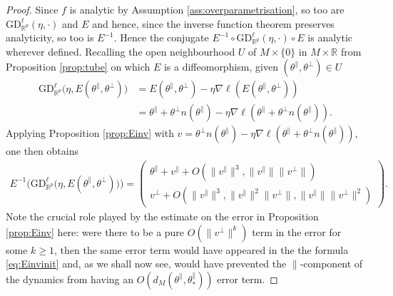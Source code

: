 \documentclass{article}
\newcommand{\RB}{\mathbb{R}}
\newcommand{\tpa}{\theta^{\parallel}}
\newcommand{\tpe}{\theta^{\perp}}
\newcommand{\GD}{\mathrm{GD}}
\theoremstyle{plain}
\theoremstyle{definition}
\theoremstyle{remark}
\begin{document}
\begin{proof}
    Since $f$ is analytic by Assumption \ref{ass:overparametrisation}, so too are $\GD^{\ell}_{\RB^p}(\eta,\cdot)$ and $E$ and hence, since the inverse function theorem preserves analyticity, so too is $E^{-1}$. Hence the conjugate $E^{-1}\circ\GD^{\ell}_{\RB^p}(\eta,\cdot)\circ E$ is analytic wherever defined. Recalling the open neighbourhood $U$ of $M\times\{0\}$ in $M\times\RB$ from Proposition \ref{prop:tube} on which $E$ is a diffeomorphism, given $(\tpa,\tpe)\in U$
    \begin{align}
        \GD_{\RB^p}^{\ell}\big(\eta,E(\tpa,\tpe)\big) &= E(\tpa,\tpe)-\eta\nabla\ell(E(\tpa,\tpe))\\&=\tpa+\tpe n(\tpa)-\eta\nabla\ell(\tpa + \tpe n(\tpa)).
    \end{align}
    Applying Proposition \ref{prop:Einv} with $v= \tpe n(\tpa)-\eta\nabla\ell(\tpa+\tpe n(\tpa))$, one then obtains
    \begin{align}
        E^{-1}\big(\GD_{\RB^p}^{\ell}\big(\eta,E(\tpa,\tpe)\big)\big) = \begin{pmatrix} \tpa+v^{\parallel}+O(\|v^{\parallel}\|^3,\|v^{\parallel}\|\|v^{\perp}\|) \\ v^{\perp} +O(\|v^{\parallel}\|^3,\|v^{\parallel}\|^2\|v^{\perp}\|,\|v^{\parallel}\|\|v^{\perp}\|^2)\end{pmatrix}.\label{eq:Einvinit}
    \end{align}
    Note the crucial role played by the estimate on the error in Proposition \ref{prop:Einv} here: were there to be a pure $O(\|v^{\perp}\|^k)$ term in the error for some $k\geq 1$, then the same error term would have appeared in the the formula \eqref{eq:Einvinit} and, as we shall now see, would have prevented the $\parallel$-component of the dynamics from having an $O(d_M(\tpa,\tpa_*))$ error term.
    

\end{proof}
\end{document}
